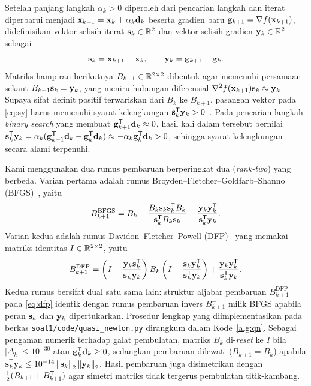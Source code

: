 \documentclass[12pt,a4paper]{article}
\begin{document}
Setelah panjang langkah $\alpha_k>0$ diperoleh dari pencarian langkah dan iterat diperbarui menjadi
$\mathbf{x}_{k+1}=\mathbf{x}_k+\alpha_k\mathbf{d}_k$ beserta gradien baru $\mathbf{g}_{k+1}=\nabla f(\mathbf{x}_{k+1})$, didefinisikan vektor selisih
iterat $\mathbf{s}_k\in\mathbb{R}^2$ dan vektor selisih gradien $\mathbf{y}_k\in\mathbb{R}^2$ sebagai
\begin{equation}\label{eq:sy}
\mathbf{s}_k=\mathbf{x}_{k+1}-\mathbf{x}_k,\qquad \mathbf{y}_k=\mathbf{g}_{k+1}-\mathbf{g}_k.
\end{equation}
Matriks hampiran berikutnya $B_{k+1}\in\mathbb{R}^{2\times2}$ dibentuk agar memenuhi persamaan sekant
$B_{k+1}\mathbf{s}_k=\mathbf{y}_k$, yang meniru hubungan diferensial $\nabla^2 f(\mathbf{x}_{k+1})\mathbf{s}_k\approx\mathbf{y}_k$. Supaya sifat definit
positif terwariskan dari $B_k$ ke $B_{k+1}$, pasangan vektor pada \eqref{eq:sy} harus memenuhi syarat kelengkungan
$\mathbf{s}_k^{\mathsf{T}}\mathbf{y}_k>0$~\cite{nocedal}. Pada pencarian langkah \emph{binary search} yang membuat
$\mathbf{g}_{k+1}^{\mathsf{T}}\mathbf{d}_k\approx0$, hasil kali dalam tersebut bernilai
$\mathbf{s}_k^{\mathsf{T}}\mathbf{y}_k=\alpha_k(\mathbf{g}_{k+1}^{\mathsf{T}}\mathbf{d}_k-\mathbf{g}_k^{\mathsf{T}}\mathbf{d}_k)\approx-\alpha_k\mathbf{g}_k^{\mathsf{T}}\mathbf{d}_k>0$, sehingga syarat kelengkungan
secara alami terpenuhi.

Kami menggunakan dua rumus pembaruan berperingkat dua (\emph{rank-two}) yang berbeda. Varian pertama adalah rumus
Broyden--Fletcher--Goldfarb--Shanno (BFGS)~\cite{bfgs}, yaitu
\begin{equation}\label{eq:bfgs}
B_{k+1}^{\mathrm{BFGS}}=B_k-\frac{B_k\mathbf{s}_k\mathbf{s}_k^{\mathsf{T}} B_k}{\mathbf{s}_k^{\mathsf{T}} B_k\mathbf{s}_k}+\frac{\mathbf{y}_k\mathbf{y}_k^{\mathsf{T}}}{\mathbf{s}_k^{\mathsf{T}}\mathbf{y}_k}.
\end{equation}
Varian kedua adalah rumus Davidon--Fletcher--Powell (DFP)~\cite{fletcherpowell} yang memakai matriks identitas
$I\in\mathbb{R}^{2\times2}$, yaitu
\begin{equation}\label{eq:dfp}
B_{k+1}^{\mathrm{DFP}}=\left(I-\frac{\mathbf{y}_k\mathbf{s}_k^{\mathsf{T}}}{\mathbf{s}_k^{\mathsf{T}}\mathbf{y}_k}\right)B_k\left(I-\frac{\mathbf{s}_k\mathbf{y}_k^{\mathsf{T}}}{\mathbf{s}_k^{\mathsf{T}}\mathbf{y}_k}\right)+\frac{\mathbf{y}_k\mathbf{y}_k^{\mathsf{T}}}{\mathbf{s}_k^{\mathsf{T}}\mathbf{y}_k}.
\end{equation}
Kedua rumus bersifat dual satu sama lain: struktur aljabar pembaruan $B_{k+1}^{\mathrm{DFP}}$ pada \eqref{eq:dfp}
identik dengan rumus pembaruan invers $B_{k+1}^{-1}$ milik BFGS apabila peran $\mathbf{s}_k$ dan $\mathbf{y}_k$ dipertukarkan.
Prosedur lengkap yang diimplementasikan pada berkas \texttt{soal1/code/quasi\_newton.py} dirangkum dalam
Kode~\ref{alg:qn}. Sebagai pengaman numerik terhadap galat pembulatan, matriks $B_k$ di-\emph{reset} ke $I$ bila
$|\Delta_k|\le10^{-30}$ atau $\mathbf{g}_k^{\mathsf{T}}\mathbf{d}_k\ge0$, sedangkan pembaruan dilewati ($B_{k+1}=B_k$) apabila
$\mathbf{s}_k^{\mathsf{T}}\mathbf{y}_k\le10^{-14}\left\lVert \mathbf{s}_k\right\rVert_2\left\lVert \mathbf{y}_k\right\rVert_2$. Hasil pembaruan juga disimetrikan dengan
$\frac{1}{2}(B_{k+1}+B_{k+1}^{\mathsf{T}})$ agar simetri matriks tidak tergerus pembulatan titik-kambang.
\end{document}
